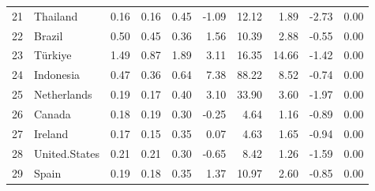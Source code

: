 \begin{table}[ht]
\begin{tabular}{rlrrrrrrrr}
  21 & Thailand & 0.16 & 0.16 & 0.45 & -1.09 & 12.12 & 1.89 & -2.73 & 0.00 \\ 
  22 & Brazil & 0.50 & 0.45 & 0.36 & 1.56 & 10.39 & 2.88 & -0.55 & 0.00 \\ 
  23 & Türkiye & 1.49 & 0.87 & 1.89 & 3.11 & 16.35 & 14.66 & -1.42 & 0.00 \\ 
  24 & Indonesia & 0.47 & 0.36 & 0.64 & 7.38 & 88.22 & 8.52 & -0.74 & 0.00 \\ 
  25 & Netherlands & 0.19 & 0.17 & 0.40 & 3.10 & 33.90 & 3.60 & -1.97 & 0.00 \\ 
  26 & Canada & 0.18 & 0.19 & 0.30 & -0.25 & 4.64 & 1.16 & -0.89 & 0.00 \\ 
  27 & Ireland & 0.17 & 0.15 & 0.35 & 0.07 & 4.63 & 1.65 & -0.94 & 0.00 \\ 
  28 & United.States & 0.21 & 0.21 & 0.30 & -0.65 & 8.42 & 1.26 & -1.59 & 0.00 \\ 
  29 & Spain & 0.19 & 0.18 & 0.35 & 1.37 & 10.97 & 2.60 & -0.85 & 0.00 \\ 
   \hline
\end{tabular}
\end{table}
